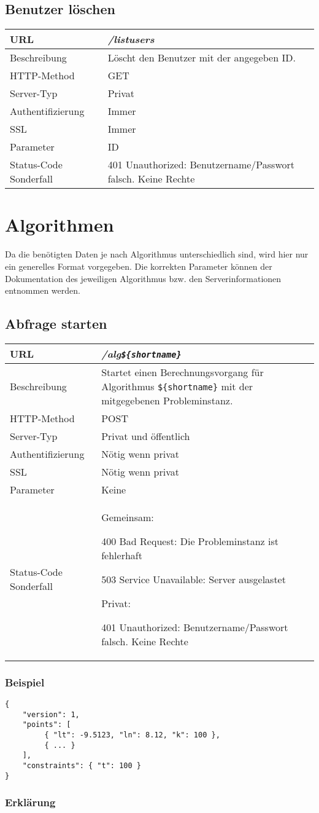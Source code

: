 \documentclass[ngerman,titlepage,parskip=true]{scrartcl}
\newcommand{\requestURL}[1]{\textit{#1}}
\newcommand{\request}[9]
{\subsection{#1}
\begin{tabular}{|p{0.2\textwidth}|p{0.7\textwidth}|}
\hline
  URL & \requestURL{#2}\\\hline
    Beschreibung & #3\\\hline
  HTTP-Method & #4\\\hline
  Server-Typ & #5\\\hline
  Authentifizierung & #6\\\hline
  SSL & #7\\\hline
  Parameter & #8\\\hline
  Status-Code Sonderfall & #9\\\hline
 \end{tabular}\vspace*{1em}}
{}%
{}%
{}%
{}%
{}%
{}%
{}%
{}%
\begin{document}
\request{Benutzer löschen}%
{/listusers}%
{Löscht den Benutzer mit der angegeben ID.}%
{GET}%
{Privat}%
{Immer}%
{Immer}%
{ID}%
{401 Unauthorized: Benutzername/Passwort falsch. Keine Rechte}%
\clearpage
   	
\section{Algorithmen}

Da die benötigten Daten je nach Algorithmus unterschiedlich sind, wird hier nur ein generelles Format vorgegeben. Die korrekten Parameter können der Dokumentation des jeweiligen Algorithmus bzw. den Serverinformationen entnommen werden.

\request{Abfrage starten}%
{/alg\texttt{\$\{shortname\}}}%
{Startet einen Berechnungsvorgang für Algorithmus \texttt{\$\{shortname\}} mit der mitgegebenen Probleminstanz.}%
{POST}%
{Privat und öffentlich}%
{Nötig wenn privat}%
{Nötig wenn privat}%
{Keine}%
{Gemeinsam:\par
400 Bad Request: Die Probleminstanz ist fehlerhaft\par
503 Service Unavailable: Server ausgelastet\par
Privat:\par
 401 Unauthorized: Benutzername/Passwort falsch. Keine Rechte}%

\subsubsection{Beispiel}
	\begin{lstlisting}
{
    "version": 1,
    "points": [
         { "lt": -9.5123, "ln": 8.12, "k": 100 },
         { ... }
    ],
    "constraints": { "t": 100 }
}    	
	\end{lstlisting}
	
		\subsubsection*{Erklärung}
	
\end{document}

